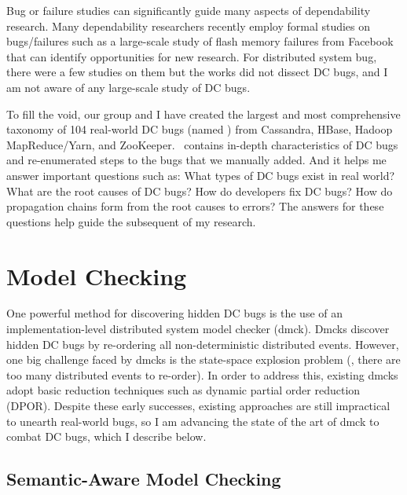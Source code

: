 \documentclass[11pt]{article}
\begin{document}
Bug or failure studies can significantly guide many aspects of dependability
research. Many dependability researchers recently employ formal studies on
bugs/failures such as a large-scale study of flash memory failures from
Facebook that can identify opportunities for new research. For distributed
system bug, there were a few studies on them but the works did not dissect DC
bugs, and I am not aware of any large-scale study of DC bugs. 

To fill the void, our group and I have created the largest and most
comprehensive taxonomy of 104 real-world DC bugs (named \taxdc) from Cassandra,
HBase, Hadoop MapReduce/Yarn, and ZooKeeper. \taxdc\ contains in-depth
characteristics of DC bugs and re-enumerated steps to the bugs that we manually
added. And it helps me answer important questions such as: What types of DC
bugs exist in real world? What are the root causes of DC bugs?  How do
developers fix DC bugs? How do propagation chains form from the root causes to
errors? The answers for these questions help guide the subsequent of my
research.



\section{Model Checking}

One powerful method for discovering hidden DC bugs is the use of an
implementation-level distributed system model checker (dmck). Dmcks discover
hidden DC bugs by re-ordering all non-deterministic distributed events.
However, one big challenge faced by dmcks is the state-space explosion problem
(\ie, there are too many distributed events to re-order). In order to address
this, existing dmcks adopt basic reduction techniques such as dynamic partial
order reduction (DPOR). Despite these early successes, existing approaches are
still impractical to unearth real-world bugs, so I am advancing the state of
the art of dmck to combat DC bugs, which I describe below.

\subsection{Semantic-Aware Model Checking} 
\end{document}
